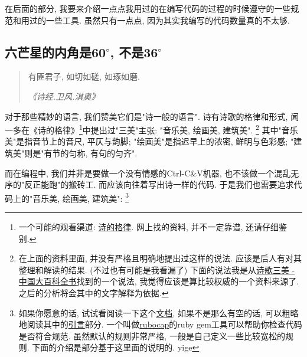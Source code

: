 在后面的部分, 我要来介绍一点点我用过的在编写代码的过程的时候遵守的一些规范和用过的一些工具. 虽然只有一点点, 因为其实我编写的代码数量真的不太够. 

\subsection{六芒星的内角是60${}^\circ$, 不是36${}^\circ$}
\begin{quotation}
  有匪君子, 如切如磋, 如琢如磨. 

  \emph{《诗经.卫风.淇奥》}
\end{quotation}

对于那些精妙的语言, 我们赞美它们是"诗一般的语言". 诗有诗歌的格律和形式, 闻一多在《诗的格律》\footnote{一个可能的观看渠道: \href{http://www.guoxue.com/wk/000461.htm}{诗的格律}. 网上找的资料, 并不一定靠谱, 还请仔细鉴别. }中提出过"三美"主张: "音乐美, 绘画美, 建筑美". \footnote{在上面的资料里面, 并没有严格且明确地提出过这样的说法. 应该是后人有对其整理和解读的结果. (不过也有可能是我看漏了) 下面的说法我是从\href{https://www.zgbk.com/ecph/words?SiteID=1&ID=88126&Type=bkzyb&SubID=44490}{诗歌三美 - 中国大百科全书}找到的一个说法, 我觉得应该是算比较权威的一个资料来源了. 之后的分析将会其中的文字解释为依据. } 其中"音乐美"是指音节上的音尺, 平仄与韵脚; "绘画美"是指迟早上的浓密, 鲜明与色彩感; "建筑美"则是"有节的匀称, 有句的匀齐". 

而在编程中, 我们并非是要做一个没有情感的Ctrl-C\&V机器, 也不该做一个混乱无序的"反正能跑"的搬砖工. 而应该向往着写出诗一样的代码. 于是我们也需要追求代码上的"音乐美, 绘画美, 建筑美": 
\footnote{如果你愿意的话, 试试看阅读一下这个\href{https://rubystyle.guide}{文档}, 如果不是那么有空的话, 可以粗略地阅读其中的\href{https://rubystyle.guide/\#introduction}{引言}部分. 一个叫做\href{https://github.com/rubocop/rubocop}{rubocap}的ruby gem工具可以帮助你检查代码是否符合规范. 虽然默认的规则非常严格, 一般是自己定义一些比较宽松的规则. 下面的介绍是部分基于这里面的说明的. yige }

